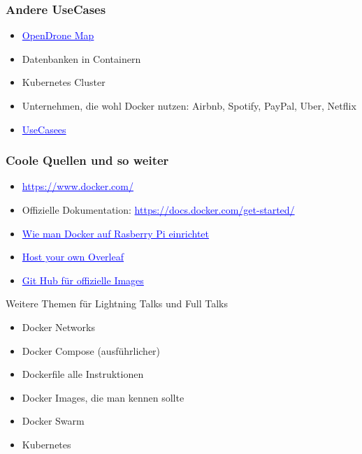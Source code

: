 \documentclass[22pt]{beamer}
\renewcommand{\href}[2]{\textcolor{blue}{\uline{#2}}}
\begin{document}
\begin{frame}[t]
    \frametitle{Andere UseCases}
    \begin{itemize}
        \item \href{https://github.com/OpenDroneMap/WebODM?tab=readme-ov-file}{OpenDrone Map}
        \item Datenbanken in Containern
        \item Kubernetes Cluster
        \item Unternehmen, die wohl Docker nutzen: Airbnb, Spotify, PayPal, Uber, Netflix
        \item \href{https://www.simplilearn.com/docker-use-cases-article}{UseCasees}
    \end{itemize}
\end{frame}

\begin{frame}[t]
    \frametitle{Coole Quellen und so weiter}
    \begin{itemize}
        \item \href{https://www.docker.com/}{https://www.docker.com/}
        \item Offizielle Dokumentation: \href{https://docs.docker.com/get-started/}{https://docs.docker.com/get-started/}
        \item \href{https://www.heise.de/news/Wie-man-Docker-auf-dem-Raspberry-Pi-in-15-Minuten-einrichtet-7524692.html}{Wie man Docker auf Rasberry Pi einrichtet}
        \item \href{https://shihabkhan1.github.io/overleaf/stepbystep.html}{Host your own Overleaf}
        \item \href{https://github.com/docker-library}{Git Hub für offizielle Images}
    \end{itemize} 
    \begin{block}{Weitere Themen für Lightning Talks und Full Talks}
        \begin{itemize}
            \item Docker Networks
            \item Docker Compose (ausführlicher)
            \item Dockerfile alle Instruktionen
            \item Docker Images, die man kennen sollte
            \item Docker Swarm
            \item Kubernetes
        \end{itemize}
        
    \end{block}
\end{frame}
\end{document}
